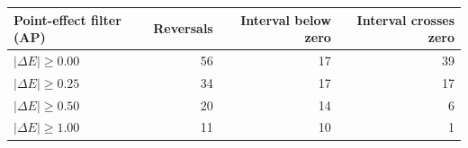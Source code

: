\begin{tabular}{lrrr}
\toprule
Point-effect filter (AP) & Reversals & Interval below zero & Interval crosses zero \\
\midrule
$|\Delta E|\geq 0.00$ & 56 & 17 & 39 \\
$|\Delta E|\geq 0.25$ & 34 & 17 & 17 \\
$|\Delta E|\geq 0.50$ & 20 & 14 & 6 \\
$|\Delta E|\geq 1.00$ & 11 & 10 & 1 \\
\bottomrule
\end{tabular}
